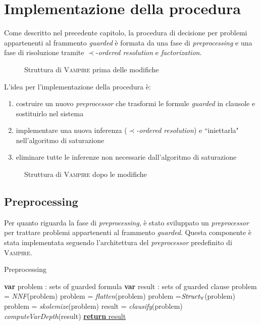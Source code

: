 \chapter{Implementazione della procedura}\label{second-c}
Come descritto nel precedente capitolo, la procedura di decisione per problemi
appartenenti al frammento \emph{guarded} è formata da una fase di \emph{preprocessing} e 
una fase di risoluzione tramite $\prec$-\emph{ordered resolution} e \emph{factorization}. 
\begin{figure}[H]
    \caption{Struttura di \textsc{Vampire} prima delle modifiche}
\end{figure}
L'idea per l'implementazione della procedura è:
\begin{enumerate}
    \item costruire un nuovo \emph{preprocessor} che trasformi le formule \emph{guarded} in clausole e sostituirlo nel sistema
    \item implementare una nuova inferenza ($\prec$\emph{-ordered resolution}) e ``iniettarla" nell'algoritmo di saturazione
    \item eliminare tutte le inferenze non necessarie dall'algoritmo di saturazione 
\end{enumerate}
\begin{figure}[H]
    \caption{Struttura di \textsc{Vampire} dopo le modifiche}
\end{figure}
\section{Preprocessing}
Per quanto riguarda la fase di \emph{preprocessing}, è stato sviluppato un \emph{preprocessor} per trattare problemi 
appartenenti al frammento \emph{guarded}. Questa componente è stata implementata seguendo l'architettura 
del \emph{preprocessor} predefinito di \textsc{Vampire}.
\begin{algorithm}
    \caption{Preprocessing}
    \begin{algorithmic}
        \State \textbf{var} problem : sets of guarded formula
        \State \textbf{var} result : sets of guarded clause 
        \State problem = \emph{NNF}(problem)
        \State problem = \emph{flatten}(problem)
        \State problem =$\text{\emph{Struct}}_\forall$(problem)
        \State problem = \emph{skolemize}(problem)
        \State result = \emph{clausify}(problem)
        \State \emph{computeVarDepth}(result)
        \State \underline{\textbf{return} result}
    \end{algorithmic}
\end{algorithm}

